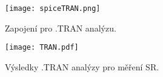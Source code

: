 \begin{figure}[h!]
    \centering
    \texttt{[image: spiceTRAN.png]}
    \caption{Zapojení pro .TRAN analýzu.}
    \label{fig:spiceTRAN.png}
\end{figure}

\begin{figure}[h!]
    \centering
    \texttt{[image: TRAN.pdf]}
    \caption{Výsledky .TRAN analýzy pro měření SR.}
    \label{fig:OVS.pdf}
\end{figure}


